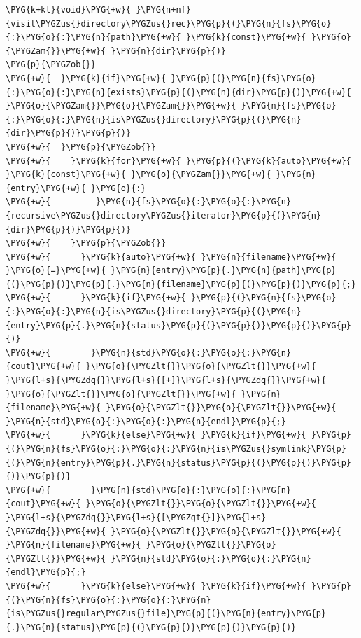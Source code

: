 \begin{itemize}
\begin{codeblockbg}
\begin{Verbatim}[commandchars=\\\{\},breaklines=true,breakanywhere=true,fontsize=\codefont,xleftmargin=17bp]
\PYG{k+kt}{void}\PYG{+w}{ }\PYG{n+nf}{visit\PYGZus{}directory\PYGZus{}rec}\PYG{p}{(}\PYG{n}{fs}\PYG{o}{:}\PYG{o}{:}\PYG{n}{path}\PYG{+w}{ }\PYG{k}{const}\PYG{+w}{ }\PYG{o}{\PYGZam{}}\PYG{+w}{ }\PYG{n}{dir}\PYG{p}{)}
\PYG{p}{\PYGZob{}}
\PYG{+w}{  }\PYG{k}{if}\PYG{+w}{ }\PYG{p}{(}\PYG{n}{fs}\PYG{o}{:}\PYG{o}{:}\PYG{n}{exists}\PYG{p}{(}\PYG{n}{dir}\PYG{p}{)}\PYG{+w}{ }\PYG{o}{\PYGZam{}}\PYG{o}{\PYGZam{}}\PYG{+w}{ }\PYG{n}{fs}\PYG{o}{:}\PYG{o}{:}\PYG{n}{is\PYGZus{}directory}\PYG{p}{(}\PYG{n}{dir}\PYG{p}{)}\PYG{p}{)}
\PYG{+w}{  }\PYG{p}{\PYGZob{}}
\PYG{+w}{    }\PYG{k}{for}\PYG{+w}{ }\PYG{p}{(}\PYG{k}{auto}\PYG{+w}{ }\PYG{k}{const}\PYG{+w}{ }\PYG{o}{\PYGZam{}}\PYG{+w}{ }\PYG{n}{entry}\PYG{+w}{ }\PYG{o}{:}
\PYG{+w}{         }\PYG{n}{fs}\PYG{o}{:}\PYG{o}{:}\PYG{n}{recursive\PYGZus{}directory\PYGZus{}iterator}\PYG{p}{(}\PYG{n}{dir}\PYG{p}{)}\PYG{p}{)}
\PYG{+w}{    }\PYG{p}{\PYGZob{}}
\PYG{+w}{      }\PYG{k}{auto}\PYG{+w}{ }\PYG{n}{filename}\PYG{+w}{ }\PYG{o}{=}\PYG{+w}{ }\PYG{n}{entry}\PYG{p}{.}\PYG{n}{path}\PYG{p}{(}\PYG{p}{)}\PYG{p}{.}\PYG{n}{filename}\PYG{p}{(}\PYG{p}{)}\PYG{p}{;}
\PYG{+w}{      }\PYG{k}{if}\PYG{+w}{ }\PYG{p}{(}\PYG{n}{fs}\PYG{o}{:}\PYG{o}{:}\PYG{n}{is\PYGZus{}directory}\PYG{p}{(}\PYG{n}{entry}\PYG{p}{.}\PYG{n}{status}\PYG{p}{(}\PYG{p}{)}\PYG{p}{)}\PYG{p}{)}
\PYG{+w}{        }\PYG{n}{std}\PYG{o}{:}\PYG{o}{:}\PYG{n}{cout}\PYG{+w}{ }\PYG{o}{\PYGZlt{}}\PYG{o}{\PYGZlt{}}\PYG{+w}{ }\PYG{l+s}{\PYGZdq{}}\PYG{l+s}{[+]}\PYG{l+s}{\PYGZdq{}}\PYG{+w}{ }\PYG{o}{\PYGZlt{}}\PYG{o}{\PYGZlt{}}\PYG{+w}{ }\PYG{n}{filename}\PYG{+w}{ }\PYG{o}{\PYGZlt{}}\PYG{o}{\PYGZlt{}}\PYG{+w}{ }\PYG{n}{std}\PYG{o}{:}\PYG{o}{:}\PYG{n}{endl}\PYG{p}{;}
\PYG{+w}{      }\PYG{k}{else}\PYG{+w}{ }\PYG{k}{if}\PYG{+w}{ }\PYG{p}{(}\PYG{n}{fs}\PYG{o}{:}\PYG{o}{:}\PYG{n}{is\PYGZus{}symlink}\PYG{p}{(}\PYG{n}{entry}\PYG{p}{.}\PYG{n}{status}\PYG{p}{(}\PYG{p}{)}\PYG{p}{)}\PYG{p}{)}
\PYG{+w}{        }\PYG{n}{std}\PYG{o}{:}\PYG{o}{:}\PYG{n}{cout}\PYG{+w}{ }\PYG{o}{\PYGZlt{}}\PYG{o}{\PYGZlt{}}\PYG{+w}{ }\PYG{l+s}{\PYGZdq{}}\PYG{l+s}{[\PYGZgt{}]}\PYG{l+s}{\PYGZdq{}}\PYG{+w}{ }\PYG{o}{\PYGZlt{}}\PYG{o}{\PYGZlt{}}\PYG{+w}{ }\PYG{n}{filename}\PYG{+w}{ }\PYG{o}{\PYGZlt{}}\PYG{o}{\PYGZlt{}}\PYG{+w}{ }\PYG{n}{std}\PYG{o}{:}\PYG{o}{:}\PYG{n}{endl}\PYG{p}{;}
\PYG{+w}{      }\PYG{k}{else}\PYG{+w}{ }\PYG{k}{if}\PYG{+w}{ }\PYG{p}{(}\PYG{n}{fs}\PYG{o}{:}\PYG{o}{:}\PYG{n}{is\PYGZus{}regular\PYGZus{}file}\PYG{p}{(}\PYG{n}{entry}\PYG{p}{.}\PYG{n}{status}\PYG{p}{(}\PYG{p}{)}\PYG{p}{)}\PYG{p}{)}

\end{Verbatim}
\end{codeblockbg}
\end{itemize}
